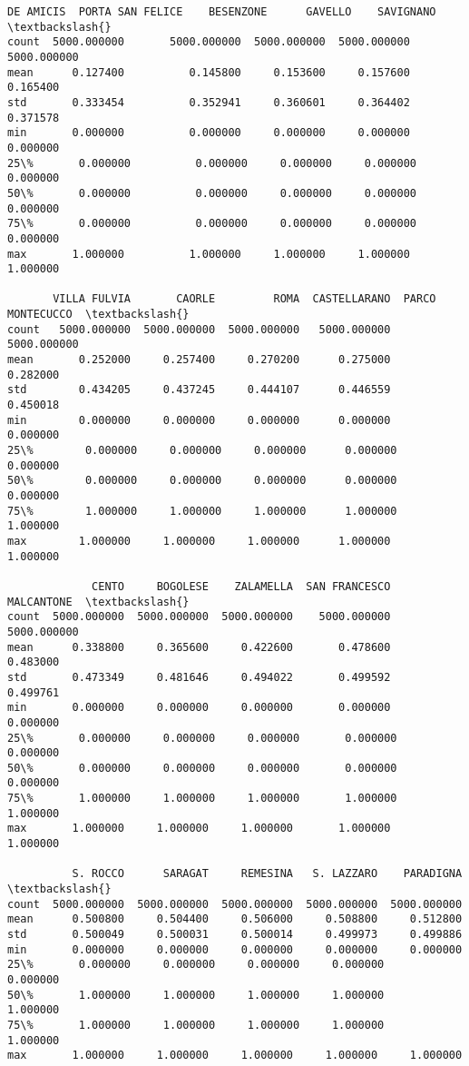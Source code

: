 \documentclass[11pt]{article}
\begin{document}
\begin{tcolorbox}[breakable, size=fbox, boxrule=.5pt, pad at break*=1mm, opacityfill=0]
\begin{Verbatim}[commandchars=\\\{\}]
         DE AMICIS  PORTA SAN FELICE    BESENZONE      GAVELLO    SAVIGNANO  \textbackslash{}
count  5000.000000       5000.000000  5000.000000  5000.000000  5000.000000
mean      0.127400          0.145800     0.153600     0.157600     0.165400
std       0.333454          0.352941     0.360601     0.364402     0.371578
min       0.000000          0.000000     0.000000     0.000000     0.000000
25\%       0.000000          0.000000     0.000000     0.000000     0.000000
50\%       0.000000          0.000000     0.000000     0.000000     0.000000
75\%       0.000000          0.000000     0.000000     0.000000     0.000000
max       1.000000          1.000000     1.000000     1.000000     1.000000

       VILLA FULVIA       CAORLE         ROMA  CASTELLARANO  PARCO MONTECUCCO  \textbackslash{}
count   5000.000000  5000.000000  5000.000000   5000.000000       5000.000000
mean       0.252000     0.257400     0.270200      0.275000          0.282000
std        0.434205     0.437245     0.444107      0.446559          0.450018
min        0.000000     0.000000     0.000000      0.000000          0.000000
25\%        0.000000     0.000000     0.000000      0.000000          0.000000
50\%        0.000000     0.000000     0.000000      0.000000          0.000000
75\%        1.000000     1.000000     1.000000      1.000000          1.000000
max        1.000000     1.000000     1.000000      1.000000          1.000000

             CENTO     BOGOLESE    ZALAMELLA  SAN FRANCESCO   MALCANTONE  \textbackslash{}
count  5000.000000  5000.000000  5000.000000    5000.000000  5000.000000
mean      0.338800     0.365600     0.422600       0.478600     0.483000
std       0.473349     0.481646     0.494022       0.499592     0.499761
min       0.000000     0.000000     0.000000       0.000000     0.000000
25\%       0.000000     0.000000     0.000000       0.000000     0.000000
50\%       0.000000     0.000000     0.000000       0.000000     0.000000
75\%       1.000000     1.000000     1.000000       1.000000     1.000000
max       1.000000     1.000000     1.000000       1.000000     1.000000

          S. ROCCO      SARAGAT     REMESINA   S. LAZZARO    PARADIGNA  \textbackslash{}
count  5000.000000  5000.000000  5000.000000  5000.000000  5000.000000
mean      0.500800     0.504400     0.506000     0.508800     0.512800
std       0.500049     0.500031     0.500014     0.499973     0.499886
min       0.000000     0.000000     0.000000     0.000000     0.000000
25\%       0.000000     0.000000     0.000000     0.000000     0.000000
50\%       1.000000     1.000000     1.000000     1.000000     1.000000
75\%       1.000000     1.000000     1.000000     1.000000     1.000000
max       1.000000     1.000000     1.000000     1.000000     1.000000


\end{Verbatim}
\end{tcolorbox}
\end{document}
